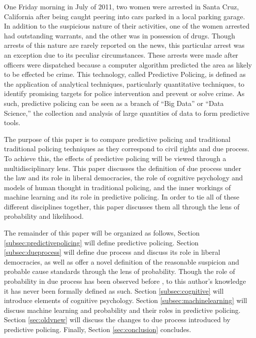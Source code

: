 \documentclass[12pt]{article} %
\begin{document}
One Friday morning in July of 2011, two women were arrested in Santa Cruz, California after being caught peering into cars parked in a local parking garage. In addition to the suspicious nature of their activities, one of the women arrested had outstanding warrants, and the other was in possession of drugs. Though arrests of this nature are rarely reported on the news, this particular arrest was an exception due to its peculiar circumstances. These arrests were made after officers were dispatched because a computer algorithm predicted the area as likely to be effected be crime. \cite{nyt} 
This technology, called Predictive Policing, is defined as the application of analytical techniques, particularly quantitative techniques, to identify promising targets for police intervention and prevent or solve crime. \cite{perryetal} As such, predictive policing can be seen as a branch of ``Big Data'' or ``Data Science,'' the collection and analysis of large quantities of data to form predictive tools.

The purpose of this paper is to compare predictive policing and traditional traditional policing techniques as they correspond to civil rights and due process. To achieve this, the effects of predictive policing will be viewed through a multidisciplinary lens. This paper discusses the definition of due process under the law and its role in liberal democracies, the role of cognitive psychology and models of human thought in traditional policing, and the inner workings of machine learning and its role in predictive policing. In order to tie all of these different disciplines together, this paper discusses them all through the lens of probability and likelihood.

The remainder of this paper will be organized as follows, Section \ref{subsec:predictivepolicing} will define predictive policing. Section \ref{subsec:dueprocess} will define due process and discuss its role in liberal democracies, as well as offer a novel definition of the reasonable suspicion and probable cause standards through the lens of probability. Though the role of probability in due process has been observed before \cite{ferguson2012predictive}, to this author's knowledge it has never been formally defined as such. Section \ref{subsec:cognitive} will introduce elements of cognitive psychology. Section \ref{subsec:machinelearning} will discuss machine learning and probability and their roles in predictive policing. Section \ref{sec:oldvnew} will discuss the changes to due process introduced by predictive policing. Finally, Section \ref{sec:conclusion} concludes.
\end{document}
